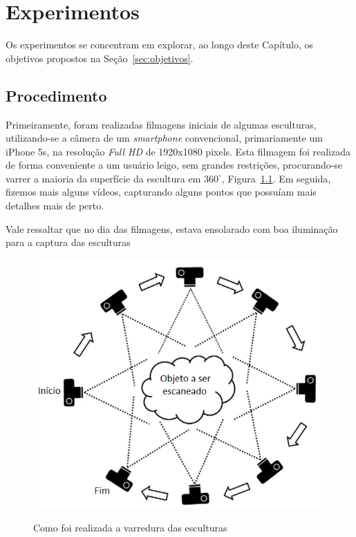 \chapter{Experimentos}\label{sec:experiments}
Os experimentos se concentram em explorar, ao longo deste Capítulo, os objetivos propostos na Seção~\ref{sec:objetivos}.

\section{Procedimento}
Primeiramente, foram realizadas filmagens iniciais de algumas esculturas,
utilizando-se a câmera de um \emph{smartphone} convencional, primariamente um
iPhone 5s, na resolução \emph{Full HD} de 1920x1080 pixels. Esta filmagem foi realizada de
forma conveniente a um usuário leigo, sem grandes restrições, procurando-se
varrer a maioria da superfície da escultura em $360^{\circ}$,
Figura~\ref{fig:procedimentoscan}.  Em seguida, fizemos mais alguns vídeos,
capturando alguns pontos que possuíam mais detalhes mais de perto.

Vale ressaltar que no dia das filmagens, estava ensolarado com boa iluminação para a captura das esculturas

\begin{figure}[!h]
	\centering
\caption{%
	Como foi realizada a varredura das esculturas
	}	
	\includegraphics[width=0.4\linewidth]{figs/procedimentoscan.png}
	\label{fig:procedimentoscan}
\end{figure}

